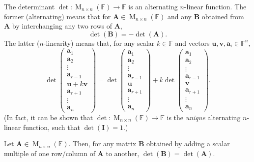 \documentclass[../Notes.tex]{subfiles}
\begin{document}
\begin{theorem}{}{}
    The determinant \(\det\colon \operatorname{M}_{n \times n}(\mathbb{F})\to \mathbb{F}\) is an alternating \(n\)-linear function. The former (alternating) means that for \(\mathbf{A}\in \operatorname{M}_{n \times n}(\mathbb{F})\) and any \(\mathbf{B}\) obtained from \(\mathbf{A}\) by interchanging any two rows of \(\mathbf{A}\),
    \[\det(\mathbf{B})=-\det(\mathbf{A}).\]
    The latter (\(n\)-linearity) means that, for any scalar \(k \in \mathbb{F}\) and vectors \(\mathbf{u},\mathbf{v},\mathbf{a}_i\in \mathbb{F}^n\),
    \[\det\begin{pmatrix}
        \mathbf{a}_1\\
        \mathbf{a}_2\\
        \vdots\\
        \mathbf{a}_{r-1}\\
        \mathbf{u}+k\mathbf{v}\\
        \mathbf{a}_{r+1}\\
        \vdots\\
        \mathbf{a}_n
    \end{pmatrix}=
    \det\begin{pmatrix}
        \mathbf{a}_1\\
        \mathbf{a}_2\\
        \vdots\\
        \mathbf{a}_{r-1}\\
        \mathbf{u}\\
        \mathbf{a}_{r+1}\\
        \vdots\\
        \mathbf{a}_n
    \end{pmatrix}+
    k\det\begin{pmatrix}
        \mathbf{a}_1\\
        \mathbf{a}_2\\
        \vdots\\
        \mathbf{a}_{r-1}\\
        \mathbf{v}\\
        \mathbf{a}_{r+1}\\
        \vdots\\
        \mathbf{a}_n
    \end{pmatrix}.\]
    (In fact, it can be shown that \(\det\colon \operatorname{M}_{n \times n}(\mathbb{F})\to \mathbb{F}\) is the \emph{unique} alternating \(n\)-linear function, such that \(\det(\mathbf{I})=1\).)
\end{theorem}
\begin{corollary}{}{}
    Let \(\mathbf{A}\in \operatorname{M}_{n \times n}(\mathbb{F})\). Then, for any matrix \(\mathbf{B}\) obtained by adding a scalar multiple of one row/column of \(\mathbf{A}\) to another, \(\det(\mathbf{B})=\det(\mathbf{A})\).
\end{corollary}
\end{document}
